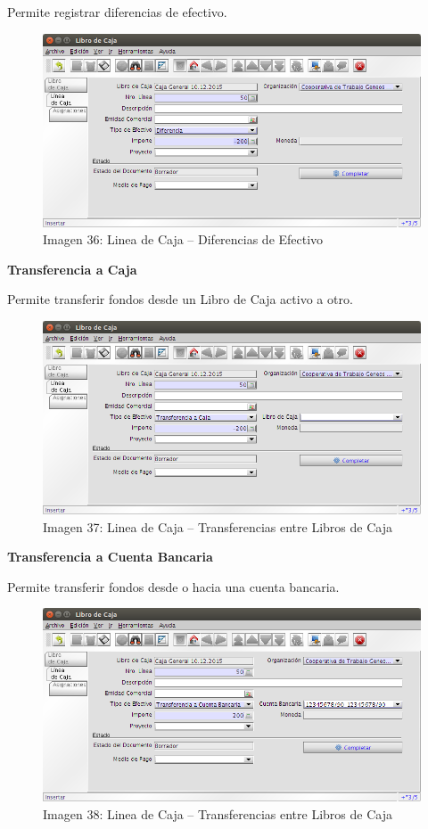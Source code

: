 \documentclass[letterpaper,10pt,spanish]{sphinxmanual}
\begin{document}
Permite registrar diferencias de efectivo.
\begin{figure}[htbp]
\centering
\capstart

\includegraphics{ly_cajas_36.png}
\caption{Imagen 36: Linea de Caja – Diferencias de Efectivo}\end{figure}

\textbf{Transferencia a Caja}

Permite transferir fondos desde un Libro de Caja activo a otro.
\begin{figure}[htbp]
\centering
\capstart

\includegraphics{ly_cajas_37.png}
\caption{Imagen 37: Linea de Caja – Transferencias entre Libros de Caja}\end{figure}

\textbf{Transferencia a Cuenta Bancaria}

Permite transferir fondos desde o hacia una cuenta bancaria.
\begin{figure}[htbp]
\centering
\capstart

\includegraphics{ly_cajas_38.png}
\caption{Imagen 38: Linea de Caja – Transferencias entre Libros de Caja}\end{figure}
\end{document}

